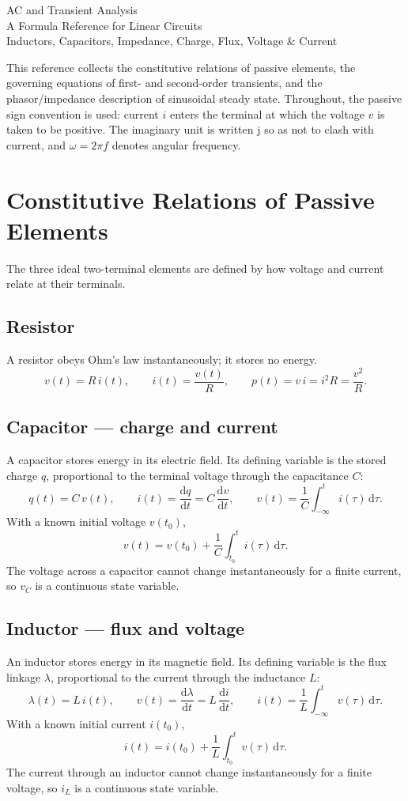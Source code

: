 \documentclass[11pt,a4paper]{article}
\newcommand{\dd}{\mathrm{d}}
\newcommand{\jj}{\mathrm{j}}
\begin{document}
\begin{center}
  {\LARGE AC and Transient Analysis}\\
  A Formula Reference for Linear Circuits\\
  Inductors, Capacitors, Impedance, Charge, Flux, Voltage \& Current
\end{center}

This reference collects the constitutive relations of passive elements, the
governing equations of first- and second-order transients, and the
phasor/impedance description of sinusoidal steady state. Throughout, the
passive sign convention is used: current $i$ enters the terminal at which the
voltage $v$ is taken to be positive. The imaginary unit is written $\jj$ so as
not to clash with current, and $\omega = 2\pi f$ denotes angular frequency.

\section{Constitutive Relations of Passive Elements}

The three ideal two-terminal elements are defined by how voltage and current
relate at their terminals.

\subsection{Resistor}
A resistor obeys Ohm's law instantaneously; it stores no energy.
\[
  v(t) = R\,i(t), \qquad i(t) = \frac{v(t)}{R}, \qquad p(t)=v\,i = i^2 R = \frac{v^2}{R}.
\]

\subsection{Capacitor --- charge and current}
A capacitor stores energy in its electric field. Its defining variable is the
stored charge $q$, proportional to the terminal voltage through the capacitance
$C$:
\[
  q(t) = C\,v(t), \qquad
  i(t) = \frac{\dd q}{\dd t} = C\,\frac{\dd v}{\dd t}, \qquad
  v(t) = \frac{1}{C}\int_{-\infty}^{t} i(\tau)\,\dd\tau .
\]
With a known initial voltage $v(t_0)$,
\[
  v(t) = v(t_0) + \frac{1}{C}\int_{t_0}^{t} i(\tau)\,\dd\tau .
\]
The voltage across a capacitor cannot change instantaneously for a finite
current, so $v_C$ is a continuous state variable.

\subsection{Inductor --- flux and voltage}
An inductor stores energy in its magnetic field. Its defining variable is the
flux linkage $\lambda$, proportional to the current through the inductance $L$:
\[
  \lambda(t) = L\,i(t), \qquad
  v(t) = \frac{\dd \lambda}{\dd t} = L\,\frac{\dd i}{\dd t}, \qquad
  i(t) = \frac{1}{L}\int_{-\infty}^{t} v(\tau)\,\dd\tau .
\]
With a known initial current $i(t_0)$,
\[
  i(t) = i(t_0) + \frac{1}{L}\int_{t_0}^{t} v(\tau)\,\dd\tau .
\]
The current through an inductor cannot change instantaneously for a finite
voltage, so $i_L$ is a continuous state variable.
\end{document}
